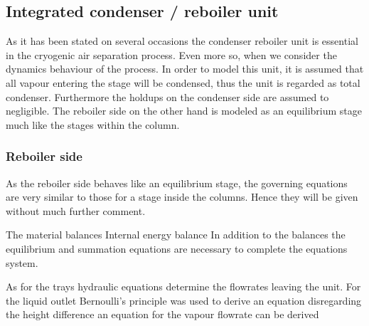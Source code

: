 \subsection{Integrated condenser / reboiler unit}

    As it has been stated on several occasions the condenser reboiler unit is essential in the cryogenic air separation process.
    Even more so, when we consider the dynamics behaviour of the process. In order to model this unit, it is assumed that
    all vapour entering the stage will be condensed, thus the unit is regarded as total condenser. Furthermore the holdups on the
    condenser side are assumed to negligible. The reboiler side on the other hand is modeled as an equilibrium stage much like
    the stages within the column.

    \subsubsection{Reboiler side}
        As the reboiler side behaves like an equilibrium stage, the governing equations are very similar to those for
        a stage inside the columns. Hence they will be given without much further comment.

        The material balances
        Internal energy balance
        In addition to the balances the equilibrium and summation equations are necessary to complete
        the equations system.

        As for the trays hydraulic equations determine the flowrates leaving the unit. For the liquid
        outlet Bernoulli's principle was used to derive an equation
        disregarding the height difference an equation for the vapour flowrate can be derived

